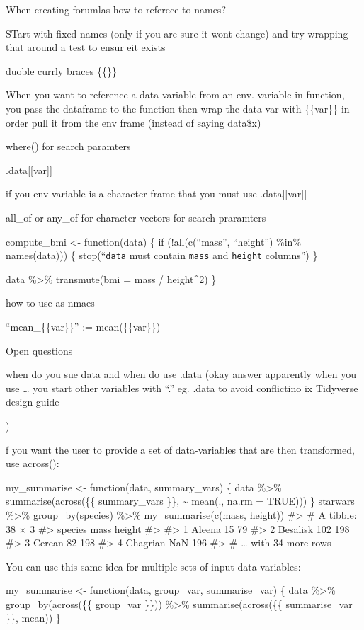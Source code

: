 \documentclass[
  letterpaper,
  DIV=11,
  numbers=noendperiod]{scrreprt}
\begin{document}
When creating forumlas how to referece to names?

STart with fixed names (only if you are sure it wont change) and try
wrapping that around a test to ensur eit exists

duoble currly braces \{\{\}\}

When you want to reference a data variable from an env. variable in
function, you pass the dataframe to the function then wrap the data var
with \{\{var\}\} in order pull it from the env frame (instead of saying
data\$x)

where() for search paramters

.data{[}{[}var{]}{]}

if you env variable is a character frame that you must use
.data{[}{[}var{]}{]}

all\_of or any\_of for character vectors for search praramters

compute\_bmi \textless- function(data) \{ if (!all(c(``mass'',
``height'') \%in\% names(data))) \{ stop(``\texttt{data} must contain
\texttt{mass} and \texttt{height} columns'') \}

data \%\textgreater\% transmute(bmi = mass / height\^{}2) \}

how to use as nmaes

``mean\_\{\{var\}\}'' := mean(\{\{var\}\})

Open questions

when do you sue data and when do use .data (okay answer apparently when
you use \ldots{} you start other variables with ``.'' eg. .data to avoid
conflictino ix \textbar{} Tidyverse design guide

)

f you want the user to provide a set of data-variables that are then
transformed, use across():

my\_summarise \textless- function(data, summary\_vars) \{ data
\%\textgreater\% summarise(across(\{\{ summary\_vars \}\},
\textasciitilde{} mean(., na.rm = TRUE))) \} starwars \%\textgreater\%
group\_by(species) \%\textgreater\% my\_summarise(c(mass, height))
\#\textgreater{} \# A tibble: 38 × 3 \#\textgreater{} species mass
height \#\textgreater{} \#\textgreater{} 1 Aleena 15 79 \#\textgreater{}
2 Besalisk 102 198 \#\textgreater{} 3 Cerean 82 198 \#\textgreater{} 4
Chagrian NaN 196 \#\textgreater{} \# \ldots{} with 34 more rows

You can use this same idea for multiple sets of input data-variables:

my\_summarise \textless- function(data, group\_var, summarise\_var) \{
data \%\textgreater\% group\_by(across(\{\{ group\_var \}\}))
\%\textgreater\% summarise(across(\{\{ summarise\_var \}\}, mean)) \}
\end{document}
